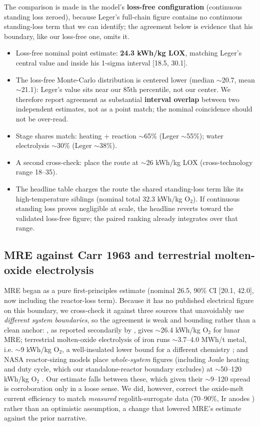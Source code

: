 \documentclass[11pt,a4paper]{article}
\begin{document}
The comparison is made in the model's \textbf{loss-free configuration} (continuous
standing loss zeroed), because Leger's full-chain figure contains no continuous
standing-loss term that we can identify; the agreement below is evidence that his
boundary, like our loss-free one, omits it.

\begin{itemize}
  \item Loss-free nominal point estimate: \textbf{24.3 kWh/kg LOX}, matching Leger's
    central value and inside his 1-sigma interval [18.5, 30.1].
  \item The loss-free Monte-Carlo distribution is centered lower (median $\sim$20.7, mean
    $\sim$21.1): Leger's value sits near our 85th percentile, not our center. We therefore
    report agreement as substantial \textbf{interval overlap} between two independent
    estimates, not as a point match; the nominal coincidence should not be over-read.
  \item Stage shares match: heating + reaction $\sim$65\% (Leger $\sim$55\%); water
    electrolysis $\sim$30\% (Leger $\sim$38\%).
  \item A second cross-check: \citet{taylor1993} place the route at $\sim$26 kWh/kg LOX
    (cross-technology range 18--35).
  \item The headline table charges the route the shared standing-loss term like its
    high-temperature siblings (nominal total 32.3 kWh/kg O$_2$). If continuous standing
    loss proves negligible at scale, the headline reverts toward the validated loss-free
    figure; the paired ranking already integrates over that range.
\end{itemize}

\subsection{MRE against Carr 1963 and terrestrial molten-oxide electrolysis}

MRE began as a pure first-principles estimate (nominal 26.5, 90\% CI [20.1, 42.0], now
including the reactor-loss term). Because it has no published electrical figure on this
boundary, we cross-check it against three sources that unavoidably use \emph{different
system boundaries}, so the agreement is weak and bounding rather than a clean anchor:
\citet{carr1963}, as reported secondarily by \citet{schreiner2016sizing}, gives
$\sim$26.4 kWh/kg O$_2$ for lunar MRE; terrestrial molten-oxide electrolysis of iron runs
$\sim$3.7--4.0 MWh/t metal, i.e. $\sim$9 kWh/kg O$_2$, a well-insulated lower bound for a
different chemistry \citep{allanore2015}; and NASA reactor-sizing models place
\emph{whole-system} figures (including Joule heating and duty cycle, which our
standalone-reactor boundary excludes) at $\sim$50--120 kWh/kg O$_2$
\citep{schreiner2016sizing}. Our estimate falls between these, which given their
$\sim$9--120 spread is corroboration only in a loose sense. We did, however, correct the
oxide-melt current efficiency to match \emph{measured} regolith-surrogate data (70--90\%,
Ir anodes \citealp{allanore2015}) rather than an optimistic assumption, a change that
lowered MRE's estimate against the prior narrative.
\end{document}
